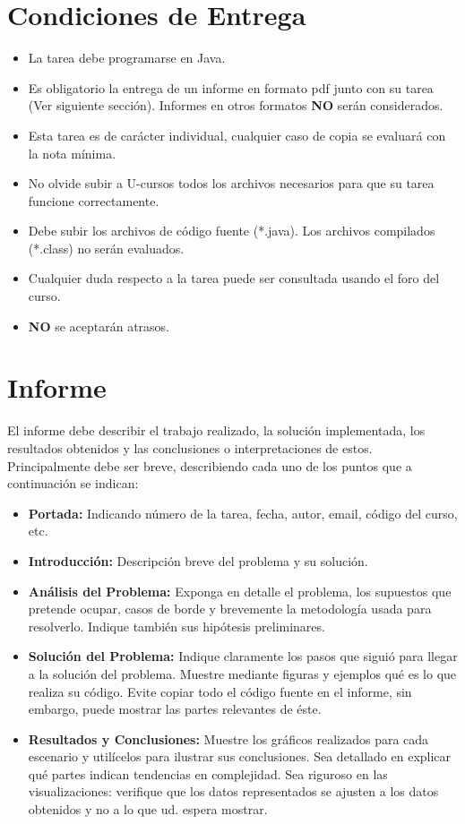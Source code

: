 \documentclass[dcc, usedate]{fcfmcourse}
\begin{document}
\section{Condiciones de Entrega}
\begin{itemize}
\item La tarea debe programarse en Java.
\item Es obligatorio la entrega de un informe en formato pdf junto con su tarea (Ver siguiente sección). Informes en otros formatos \textbf{NO} serán considerados.
\item Esta tarea es de carácter individual, cualquier caso de copia se evaluará con la nota mínima.
\item No olvide subir a U-cursos todos los archivos necesarios para que su tarea funcione correctamente.
\item Debe subir los archivos de código fuente (*.java). Los archivos compilados (*.class) no serán evaluados.
\item Cualquier duda respecto a la tarea puede ser consultada usando el foro del curso.
\item \textbf{NO} se aceptarán atrasos.
\end{itemize}

\section{Informe}
El informe debe describir el trabajo realizado, la solución implementada, los resultados obtenidos y las conclusiones o interpretaciones de estos. Principalmente debe ser breve, describiendo cada uno de los puntos que a continuación se indican:
\begin{itemize}
\item \textbf{Portada:} Indicando número de la tarea, fecha, autor, email, código del curso, etc.
\item \textbf{Introducción:} Descripción breve del problema y su solución.
\item \textbf{Análisis del Problema:} Exponga en detalle el problema, los supuestos que pretende ocupar, casos de borde y brevemente la metodología usada para resolverlo. Indique también sus hipótesis preliminares.
\item \textbf{Solución del Problema:} Indique claramente los pasos que siguió para llegar a la solución del problema. Muestre mediante figuras y ejemplos qué es lo que realiza su código. Evite copiar todo el código fuente en el informe, sin embargo, puede mostrar las partes relevantes de éste.
\item \textbf{Resultados y Conclusiones:} Muestre los gráficos realizados para cada escenario y utilícelos para ilustrar sus conclusiones. Sea detallado en explicar qué partes indican tendencias en complejidad. Sea riguroso en las visualizaciones: verifique que los datos representados se ajusten a los datos obtenidos y no a lo que ud. espera mostrar.
\end{itemize}
\end{document}
